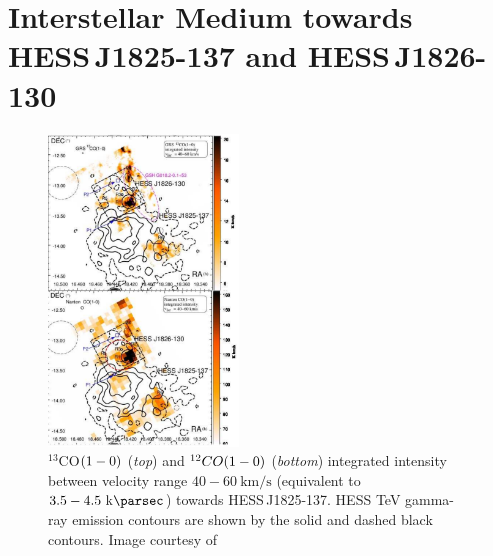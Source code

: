 \chapter[ISM towards \mbox{HESS\,J1825-137} and \mbox{HESS\,J1826-130}]{Interstellar Medium towards \\ \mbox{HESS\,J1825-137} and \mbox{HESS\,J1826-130}} \label{06_ISM}

\begin{figure}
	\centering
	\includegraphics[width=0.45\textwidth]{06_Interstellar_Medium/Images/18252.png}
    \caption{$^{13}$CO$\qty(1-0)$ (\textit{top}) and $^{12}CO\qty(1-0)$ (\textit{bottom}) integrated intensity between velocity range $40-60~\si{\kilo\meter\per\second}$ (equivalent to $3.5-4.5~\kpc$) towards \mbox{HESS\,J1825-137}. HESS TeV gamma-ray emission contours are shown by the solid and dashed black contours. Image courtesy of \citep{2016MNRAS.458.2813V}}
	\label{fig:chapter_6_1825_gas}
\end{figure}

